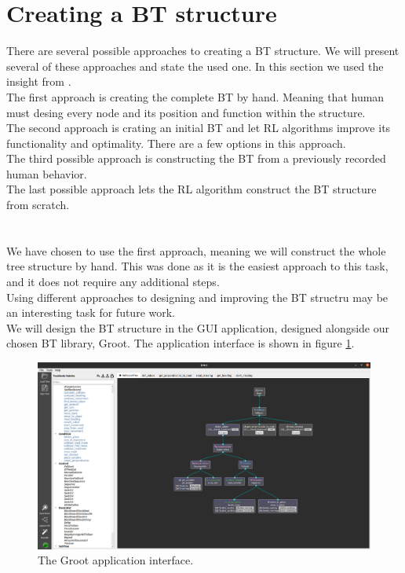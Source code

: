 \section{Creating a BT structure}
    There are several possible approaches to creating a BT structure. We will present several of these approaches and state the used one. In this section we used the insight from \cite{BT_creation}.\\
    The first approach is creating the complete BT by hand. Meaning that human must desing every node and its position and function within the structure.\\
    The second approach is crating an initial BT and let RL algorithms improve its functionality and optimality. There are a few options in this approach.\\
    The third possible approach is constructing the BT from a previously recorded human behavior.\\
    The last possible approach lets the RL algorithm construct the BT structure from scratch.\\\\
    \\
    We have chosen to use the first approach, meaning we will construct the whole tree structure by hand. This was done as it is the easiest approach to this task, and it does not require any additional steps.\\
    Using different approaches to designing and improving the BT structru may be an interesting task for future work.\\
    We will design the BT structure in the GUI application, designed alongside our chosen BT library, Groot. The application interface is shown in figure \ref{fig:groot}.
    \begin{figure}[ht]
        \centering
        \includegraphics[width=\linewidth]{images/Groot.png}
        \caption{The Groot application interface.}
        \label{fig:groot}
    \end{figure}


